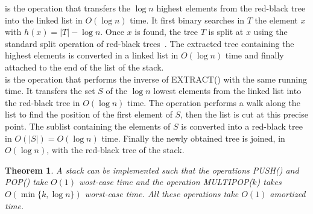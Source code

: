 \documentclass[letterpaper,11pt]{article}
\newtheorem{thm}{Theorem}
\begin{document}
 is the operation that transfers the $\log n$ highest elements from the red-black tree into the linked list in $O(\log n)$ time. It first binary searches in $T$ the element $x$ with $h(x)=|T|-\log n$. Once $x$ is found, the tree $T$ is split at $x$ using the standard split operation of red-black trees~\cite{redblack}. The extracted tree containing the highest elements is converted in a linked list in $O(\log n)$ time and finally attached to the end of the list of the stack. \\

 is the operation that performs the inverse of {E{\scriptsize XTRACT}()} with the same running time. It transfers the set $S$ of the $\log n$ lowest elements from the linked list into the red-black tree in $O(\log n)$ time. The operation performs a walk along the list to find the position of the first element of $S$, then the list is cut at this precise point. The sublist containing the elements of $S$ is converted into a red-black tree in $O(|S|)=O(\log n)$ time. Finally the newly obtained tree is joined, in $O(\log n)$, with the red-black tree of the stack.\\

\begin{thm}
A stack can be implemented such that the operations {P{\scriptsize USH}()} and {P{\scriptsize OP}()} take $O(1)$ wost-case time and the operation {M{\scriptsize ULTIPOP}($k$)} takes $O(\min\{k,\log n\})$ worst-case time. All these operations take $O(1)$ amortized time. 
\end{thm}
\end{document}
